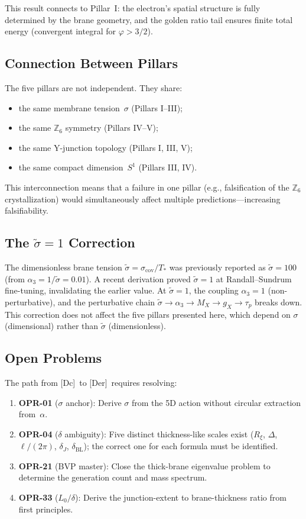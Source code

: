 \documentclass[12pt,a4paper]{article}
\theoremstyle{definition}
\theoremstyle{remark}
\newcommand{\tagDer}{\textsf{[Der]}}
\newcommand{\tagDc}{\textsf{[Dc]}}
\newcommand{\Zn}[1]{\mathbb{Z}_{#1}}
\begin{document}
This result connects to Pillar~I: the electron's spatial structure
is fully determined by the brane geometry, and the golden ratio
tail ensures finite total energy (convergent integral for
$\varphi > 3/2$).

\subsection{Connection Between Pillars}

The five pillars are not independent.  They share:
\begin{itemize}[nosep]
\item the same membrane tension~$\sigma$ (Pillars I--III);
\item the same $\Zn{6}$ symmetry (Pillars IV--V);
\item the same Y-junction topology (Pillars I, III, V);
\item the same compact dimension~$S^1$ (Pillars III, IV).
\end{itemize}
This interconnection means that a failure in one pillar (e.g.,
falsification of the $\Zn{6}$ crystallization) would simultaneously
affect multiple predictions---increasing falsifiability.

\subsection{The $\tilde\sigma = 1$ Correction}

The dimensionless brane tension $\tilde\sigma = \sigma_{\mathrm{cov}}/T_*$
was previously reported as $\tilde\sigma = 100$ (from
$\alpha_3 = 1/\tilde\sigma = 0.01$).  A recent derivation proved
$\tilde\sigma = 1$ at Randall--Sundrum fine-tuning, invalidating the
earlier value.  At $\tilde\sigma = 1$, the coupling $\alpha_3 = 1$
(non-perturbative), and the perturbative chain $\tilde\sigma \to
\alpha_3 \to M_X \to g_X \to \tau_p$ breaks down.  This correction
does not affect the five pillars presented here, which depend on
$\sigma$ (dimensional) rather than $\tilde\sigma$ (dimensionless).

\subsection{Open Problems}

The path from \tagDc\ to \tagDer\ requires resolving:
\begin{enumerate}[nosep]
\item \textbf{OPR-01} ($\sigma$ anchor): Derive $\sigma$ from the
  5D action without circular extraction from~$\alpha$.
\item \textbf{OPR-04} ($\delta$ ambiguity): Five distinct
  thickness-like scales exist ($R_\xi$, $\Delta$, $\ell/(2\pi)$,
  $\delta_J$, $\delta_{\mathrm{BL}}$); the correct one for each
  formula must be identified.
\item \textbf{OPR-21} (BVP master): Close the thick-brane
  eigenvalue problem to determine the generation count and mass
  spectrum.
\item \textbf{OPR-33} ($L_0/\delta$): Derive the junction-extent to
  brane-thickness ratio from first principles.
\end{enumerate}
\end{document}
